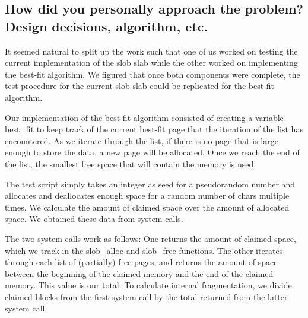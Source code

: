 \documentclass[letterpaper, onecolumn, draftclsnofoot, 10pt, compsoc]{IEEEtran}
\begin{document}
    \subsection{How did you personally approach the problem? Design decisions, algorithm, etc.}
        \begin{singlespace}
        It seemed natural to split up the work such that one of us worked on testing the current implementation of the slob slab while the other worked on implementing the best-fit algorithm. We figured that once both components were complete, the test procedure for the current slob slab could be replicated for the best-fit algorithm.
        
        Our implementation of the best-fit algorithm consisted of creating a variable best\_fit to keep track of the current best-fit page that the iteration of the list has encountered. As we iterate through the list, if there is no page that is large enough to store the data, a new page will be allocated. Once we reach the end of the list, the smallest free space that will contain the memory is used.
        
        The test script simply takes an integer as seed for a pseudorandom number and allocates and deallocates enough space for a random number of chars multiple times. We calculate the amount of claimed space over the amount of allocated space. We obtained these data from system calls.
        
        The two system calls work as follows: One returns the amount of claimed space, which we track in the slob\_alloc and slob\_free functions. The other iterates through each list of (partially) free pages, and returns the amount of space between the beginning of the claimed memory and the end of the claimed memory. This value is our total. To calculate internal fragmentation, we divide claimed blocks from the first system call by the total returned from the latter system call.
        \end{singlespace}
    
\end{document}
